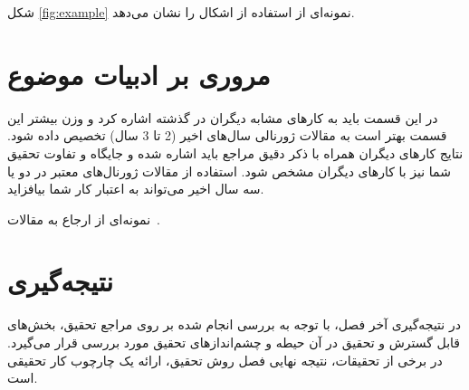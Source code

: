شکل \ref{fig:example} نمونه‌ای از استفاده از اشکال را نشان می‌دهد.

\section{مروری بر ادبیات موضوع}
در این قسمت باید به کارهای مشابه دیگران در گذشته اشاره کرد و وزن بیشتر این قسمت بهتر است به
مقالات ژورنالی سال‌های اخیر (2 تا 3 سال) تخصیص داده شود. نتایج کارهای دیگران همراه با ذکر دقیق
مراجع باید اشاره شده و جایگاه و تفاوت تحقیق شما نیز با کارهای دیگران مشخص شود. استفاده از مقالات
ژورنال‌های معتبر در دو یا سه سال اخیر می‌تواند به اعتبار کار شما بیافزاید.

نمونه‌ای از ارجاع به مقالات~\cite{fairoze2023publicly}. %

\section{نتیجه‌گیری}
در نتیجه‌گیری آخر فصل، با توجه به بررسی انجام شده بر روی مراجع تحقیق، بخش‌های قابل گسترش و تحقیق در آن حیطه و چشم‌اندازهای تحقیق مورد بررسی قرار می‌گیرد. در برخی از تحقیقات، نتیجه نهایی فصل روش تحقیق، ارائه یک چارچوب کار تحقیقی است.

